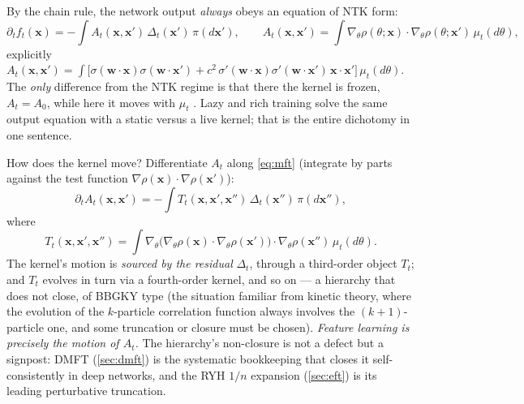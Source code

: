\documentclass[11pt]{article}
\newcommand{\bv}[1]{\boldsymbol{#1}}
\begin{document}
By the chain rule, the network output \emph{always} obeys an equation of
NTK form:
\begin{equation}
  \label{eq:output-ode}
  \partial_t f_t(\bv{x}) = -\int A_t(\bv{x},\bv{x}')\,
  \Delta_t(\bv{x}')\,\pi(d\bv{x}'),
  \qquad
  A_t(\bv{x},\bv{x}') = \int \nabla_\theta\rho(\theta;\bv{x})\cdot
  \nabla_\theta\rho(\theta;\bv{x}')\,\mu_t(d\theta),
\end{equation}
explicitly
$A_t(\bv{x},\bv{x}') = \int \bigl[\sigma(\bv{w}\cdot\bv{x})
\sigma(\bv{w}\cdot\bv{x}') + c^2\,\sigma'(\bv{w}\cdot\bv{x})
\sigma'(\bv{w}\cdot\bv{x}')\,\bv{x}\cdot\bv{x}'\bigr]\,\mu_t(d\theta)$.
The \emph{only} difference from the NTK regime is that there the kernel is
frozen, $A_t = A_0$, while here it moves with $\mu_t$
\cite[Rem.~20.1]{spiliopoulos2025foundations}. Lazy and rich training solve
the same output equation with a static versus a live kernel; that is the
entire dichotomy in one sentence.

How does the kernel move? Differentiate $A_t$ along \cref{eq:mft}
(integrate by parts against the test function
$\nabla\rho(\bv{x})\cdot\nabla\rho(\bv{x}')$):
\begin{equation}
  \label{eq:kernel-ode}
  \partial_t A_t(\bv{x},\bv{x}') = -\int T_t(\bv{x},\bv{x}',\bv{x}'')\,
  \Delta_t(\bv{x}'')\,\pi(d\bv{x}''),
\end{equation}
where
\begin{equation}
  T_t(\bv{x},\bv{x}',\bv{x}'') = \int \nabla_\theta\bigl(
  \nabla_\theta\rho(\bv{x})\cdot\nabla_\theta\rho(\bv{x}')\bigr)
  \cdot \nabla_\theta\rho(\bv{x}'')\,\mu_t(d\theta).
\end{equation}
The kernel's motion is \emph{sourced by the residual} $\Delta_t$, through a
third-order object $T_t$; and $T_t$ evolves in turn via a fourth-order
kernel, and so on --- a hierarchy that does not close, of BBGKY type (the
situation familiar from kinetic theory, where the evolution of the
$k$-particle correlation function always involves the $(k{+}1)$-particle
one, and some truncation or closure must be chosen).
\emph{Feature learning is precisely the motion of $A_t$.} The hierarchy's
non-closure is not a defect but a signpost: DMFT (\cref{sec:dmft}) is the
systematic bookkeeping that closes it self-consistently in deep networks,
and the RYH $1/n$ expansion (\cref{sec:eft}) is its leading perturbative
truncation.
\end{document}
